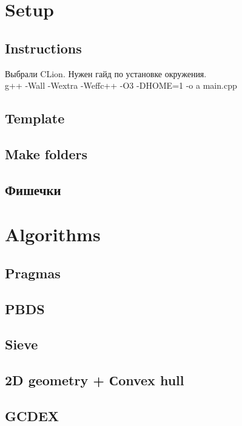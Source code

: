 \documentclass{article}
\begin{document}
\begin{multicols}{2}

\tableofcontents

\section{Setup}
\subsection{Instructions}
Выбрали CLion. Нужен гайд по установке окружения.
\\ g++ -Wall -Wextra -Weffc++ -O3 -DHOME=1 -o a main.cpp
\subsection{Template}

\subsection{Make folders}

\subsection{Фишечки}

\section{Algorithms}
\subsection{Pragmas}

\subsection{PBDS}

\subsection{Sieve}

\subsection{2D geometry + Сonvex hull}

\subsection{GCDEX}


\end{multicols}
\end{document}
